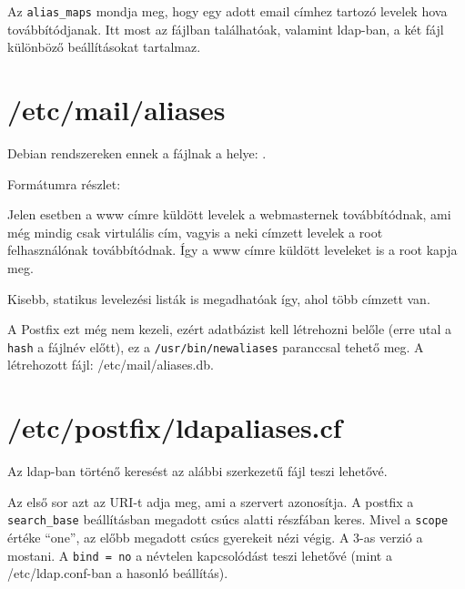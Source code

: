 Az \texttt{alias\_maps} mondja meg, hogy egy adott email címhez tartozó levelek hova továbbítódjanak. Itt most az
 fájlban találhatóak, valamint ldap-ban, a két fájl különböző beállításokat tartalmaz.

\section{/etc/mail/aliases}
Debian rendszereken ennek a fájlnak a helye: .

Formátumra részlet:\\

Jelen esetben a www címre küldött levelek a webmasternek továbbítódnak, ami még mindig csak virtulális cím, vagyis a
neki címzett levelek a root felhasználónak továbbítódnak. Így a www címre küldött leveleket is a root kapja meg.

Kisebb, statikus levelezési listák is megadhatóak így, ahol több címzett van.

A Postfix ezt még nem kezeli, ezért adatbázist kell létrehozni belőle (erre utal a \texttt{hash} a fájlnév előtt), ez
a \texttt{/usr/bin/newaliases} paranccsal tehető meg. A létrehozott fájl: /etc/mail/aliases.db.



\section{/etc/postfix/ldapaliases.cf}
Az ldap-ban történő keresést az alábbi szerkezetű fájl teszi lehetővé.


Az első sor azt az URI-t adja meg, ami a szervert azonosítja. A postfix a \texttt{search\_base} beállításban megadott
csúcs alatti részfában keres. Mivel a \texttt{scope} értéke ``one'', az előbb megadott csúcs gyerekeit nézi végig. A
3-as verzió  a mostani. A \texttt{bind = no} a névtelen kapcsolódást teszi lehetővé (mint a /etc/ldap.conf-ban a
hasonló beállítás).

